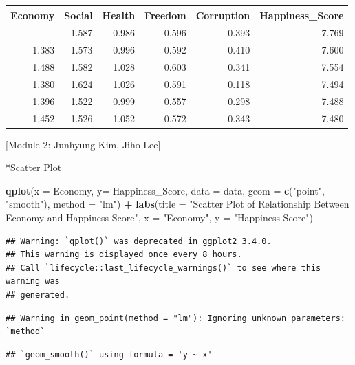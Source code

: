 \documentclass[
  11pt,
]{article}
\newenvironment{Shaded}{\begin{snugshade}}{\end{snugshade}}
\newcommand{\AttributeTok}[1]{\textcolor[rgb]{0.13,0.29,0.53}{#1}}
\newcommand{\FunctionTok}[1]{\textcolor[rgb]{0.13,0.29,0.53}{\textbf{#1}}}
\newcommand{\NormalTok}[1]{#1}
\newcommand{\SpecialCharTok}[1]{\textcolor[rgb]{0.81,0.36,0.00}{\textbf{#1}}}
\newcommand{\StringTok}[1]{\textcolor[rgb]{0.31,0.60,0.02}{#1}}
\begin{document}
\begin{longtable}[]{@{}rrrrrr@{}}
\toprule\noalign{}
Economy & Social & Health & Freedom & Corruption & Happiness\_Score \\
\midrule\noalign{}
\endhead
\bottomrule\noalign{}
\endlastfoot
1.340 & 1.587 & 0.986 & 0.596 & 0.393 & 7.769 \\
1.383 & 1.573 & 0.996 & 0.592 & 0.410 & 7.600 \\
1.488 & 1.582 & 1.028 & 0.603 & 0.341 & 7.554 \\
1.380 & 1.624 & 1.026 & 0.591 & 0.118 & 7.494 \\
1.396 & 1.522 & 0.999 & 0.557 & 0.298 & 7.488 \\
1.452 & 1.526 & 1.052 & 0.572 & 0.343 & 7.480 \\
\end{longtable}

{[}Module 2: Junhyung Kim, Jiho Lee{]}

*Scatter Plot

\begin{Shaded}
\begin{Highlighting}[]
\FunctionTok{qplot}\NormalTok{(}\AttributeTok{x =}\NormalTok{ Economy, }\AttributeTok{y=}\NormalTok{ Happiness\_Score, }\AttributeTok{data =}\NormalTok{ data,}
 \AttributeTok{geom =} \FunctionTok{c}\NormalTok{(}\StringTok{"point"}\NormalTok{, }\StringTok{"smooth"}\NormalTok{), }\AttributeTok{method =} \StringTok{"lm"}\NormalTok{) }\SpecialCharTok{+}
 \FunctionTok{labs}\NormalTok{(}\AttributeTok{title =}
 \StringTok{"Scatter Plot of Relationship Between}
\StringTok{ Economy and Happiness Score"}\NormalTok{,}
 \AttributeTok{x =} \StringTok{"Economy"}\NormalTok{, }\AttributeTok{y =} \StringTok{"Happiness Score"}\NormalTok{)}
\end{Highlighting}
\end{Shaded}

\begin{verbatim}
## Warning: `qplot()` was deprecated in ggplot2 3.4.0.
## This warning is displayed once every 8 hours.
## Call `lifecycle::last_lifecycle_warnings()` to see where this warning was
## generated.
\end{verbatim}

\begin{verbatim}
## Warning in geom_point(method = "lm"): Ignoring unknown parameters: `method`
\end{verbatim}

\begin{verbatim}
## `geom_smooth()` using formula = 'y ~ x'
\end{verbatim}
\end{document}
